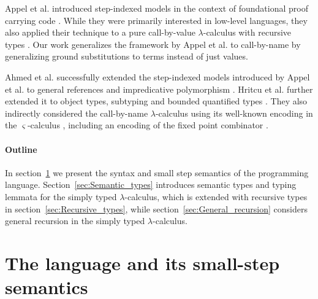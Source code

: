 \documentclass[10pt,a4paper,final,twocolumn]{article}
\theoremstyle{definition}
\theoremstyle{plain}
\begin{document}
Appel et al. introduced step-indexed models in the context of foundational proof carrying code \cite{Appel00}.
While they were primarily interested in low-level languages, they also applied their technique to a pure
call-by-value $\lambda$-calculus with recursive types \cite{Appel01}. Our work generalizes the framework
by Appel et al. to call-by-name by generalizing ground substitutions to terms instead of just values.

Ahmed et al. successfully extended the step-indexed models introduced by Appel et al. to general references
and impredicative polymorphism \cite{Ahmed04,Ahmed02}. Hritcu et al. further extended it to object types,
subtyping and bounded quantified types \cite{Hritcu07,Hritcu09}. They also indirectly considered the
call-by-name $\lambda$-calculus using its well-known encoding in the $\varsigma$-calculus \cite{AbadiCardelli96},
including an encoding of the fixed point combinator \cite{Fisher94}.


\paragraph{Outline}
\label{par:Outline}


In section~\ref{sec:The_language_and_its_small_step_semantics} we present the syntax and small step
semantics of the programming language. Section~\ref{sec:Semantic_types} introduces semantic types
and typing lemmata for the simply typed $\lambda$-calculus, which is extended with recursive types in
section~\ref{sec:Recursive_types}, while section~\ref{sec:General_recursion} considers general recursion
in the simply typed $\lambda$-calculus.


\section{The language and its small-step semantics}
\label{sec:The_language_and_its_small_step_semantics}
\end{document}
